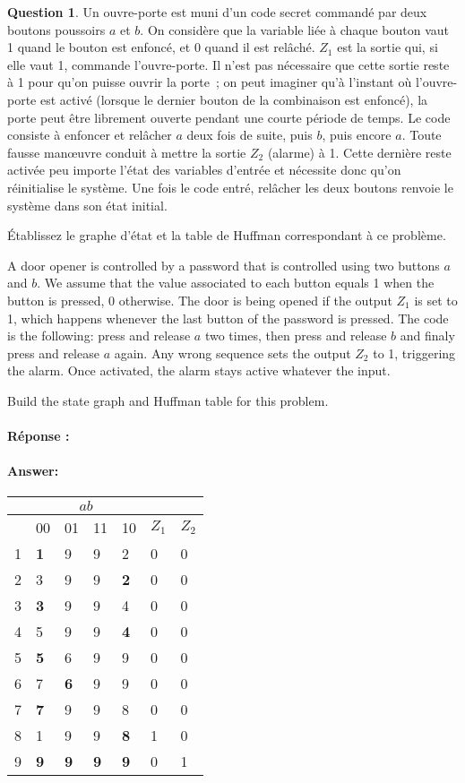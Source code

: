 \documentclass[11pt,a4paper,dvipsnames]{article}
\theoremstyle{definition}%
\newtheorem{Q}{Question}[] %
\newcommand{\reponse}[1]{%
	\ifthenelse {\boolean{corrige}} {\fr{\paragraph{Réponse :}}\en{\paragraph{Answer:}} \color{darkblue}   #1\color{black}} {}
 }
\newcommand{\fr}[1]{
 	\ifthenelse {\boolean{fr}} {#1} {}
 }
\newcommand{\en}[1]{
 	\ifthenelse {\boolean{en}} {#1} {}
 }
\begin{document}
\begin{Q}
	\fr{Un ouvre-porte est muni d'un code secret commandé par deux boutons poussoirs $a$ et $b$.
	On considère que la variable liée à chaque bouton vaut 1 quand le bouton est enfoncé, et 0 quand il est relâché.
	$Z_1$ est la sortie qui, si elle vaut 1, commande l'ouvre-porte.
	Il n'est pas nécessaire que cette sortie reste à 1 pour qu'on puisse ouvrir la porte~; on peut imaginer qu'à l'instant où l'ouvre-porte est activé (lorsque le dernier bouton de la combinaison est enfoncé), la porte peut être librement ouverte pendant une courte période de temps.
	Le code consiste à enfoncer et relâcher $a$ deux fois de suite, puis $b$, puis encore $a$.
	Toute fausse manœuvre conduit à mettre la sortie $Z_2$ (alarme) à 1.
	Cette dernière reste activée peu importe l'état des variables d'entrée et nécessite donc qu'on réinitialise le système.
	Une fois le code entré, relâcher les deux boutons renvoie le système dans son état initial.

	Établissez le graphe d'état et la table de Huffman correspondant à ce problème.}
	
	\en{A door opener is controlled by a password that is controlled using two buttons $a$ and $b$.
	We assume that the value associated to each button equals 1 when the button is pressed, 0 otherwise.
	The door is being opened if the output $Z_1$ is set to 1, which happens whenever the last button of the password is pressed.
	The code is the following: press and release $a$ two times, then press and release $b$ and finaly press and release $a$ again.
	Any wrong sequence sets the output $Z_2$ to 1, triggering the alarm.
	Once activated, the alarm stays active whatever the input.

	Build the state graph and Huffman table for this problem.
	}
	\reponse{
		\begin{center}
			\begin{tabular}{|l|l|l|l|l|l|l|} \hline
				& \multicolumn{4}{c}{$ab$} & & \\ \hline
				& 00 & 01 & 11 & 10 & $Z_1$ & $Z_2$ \\ \hline
				1 & \textbf{1} & 9 & 9 & 2 & 0 & 0 \\ \hline
				2 & 3 & 9 & 9 & \textbf{2} & 0 & 0 \\ \hline
				3 & \textbf{3} & 9 & 9 & 4 & 0 & 0 \\ \hline
				4 & 5 & 9 & 9 & \textbf{4} & 0 & 0 \\ \hline
				5 & \textbf{5} & 6 & 9 & 9 & 0 & 0 \\ \hline
				6 & 7 & \textbf{6} & 9 & 9 & 0 & 0 \\ \hline
				7 & \textbf{7} & 9 & 9 & 8 & 0 & 0 \\ \hline
				8 & 1 & 9 & 9 & \textbf{8} & 1 & 0 \\ \hline
				9 & \textbf{9} & \textbf{9} & \textbf{9} & \textbf{9} & 0 & 1 \\ \hline
			\end{tabular}
		\end{center}

}
\end{Q}
\end{document}
